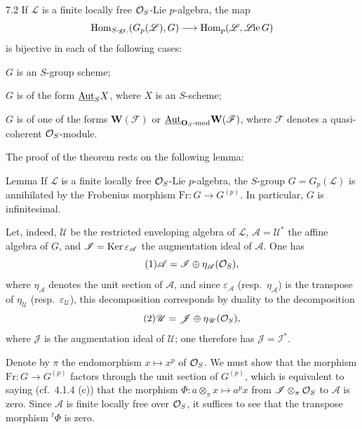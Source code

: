 \begin{theorem}{7.2}\label{VIIA.7.2}
If $\mathscr L$ is a finite locally free $\mathcal{O}_S$-Lie $p$-algebra, the map
\[
\operatorname{Hom}_{S\text{-gr.}}(G_p(\mathscr L),G)\longrightarrow\operatorname{Hom}_p(\mathscr L,\mathscr L\!\mathrm{ie}\,G)
\]
is bijective in each of the following cases:
\begin{enumeratei}
\item $G$ is an $S$-group scheme;
\item $G$ is of the form $\underline{\operatorname{Aut}}_S X$, where $X$ is an $S$-scheme;
\item $G$ is of one of the forms $\mathbf W(\mathscr F)$ or $\underline{\operatorname{Aut}}_{\mathbf O_S\text{-mod}}\mathbf W(\mathscr F)$, where $\mathscr F$ denotes a quasi-coherent $\mathcal{O}_S$-module.
\end{enumeratei}
\end{theorem}
The proof of the theorem rests on the following lemma:
\begin{enonce}{Lemma}{}
If $\mathscr L$ is a finite locally free $\mathcal{O}_S$-Lie $p$-algebra, the $S$-group $G=G_p(\mathscr L)$ is annihilated by the Frobenius morphism $\mathrm{Fr}:G\to G^{(p)}$. In particular, $G$ is infinitesimal.
\end{enonce}

Let, indeed, $\mathscr U$ be the restricted enveloping algebra of $\mathscr L$, $\mathscr A=\mathscr U^*$ the affine algebra of $G$, and $\mathscr I=\operatorname{Ker}\varepsilon_{\mathscr A}$ the augmentation ideal of $\mathscr A$. One has
\begin{equation}\tag{1}\mathscr A=\mathscr I\oplus\eta_{\mathscr A}(\mathcal{O}_S),\end{equation}
where $\eta_{\mathscr A}$ denotes the unit section of $\mathscr A$, and since $\varepsilon_{\mathscr A}$ (resp.\ $\eta_{\mathscr A}$) is the transpose of $\eta_{\mathscr U}$ (resp.\ $\varepsilon_{\mathscr U}$), this decomposition corresponds by duality to the decomposition
\begin{equation}\tag{2}\mathscr U=\mathscr J\oplus\eta_{\mathscr U}(\mathcal{O}_S),\end{equation}
where $\mathscr J$ is the augmentation ideal of $\mathscr U$; one therefore has $\mathscr J=\mathscr I^*$.

Denote by $\pi$ the endomorphism $x\mapsto x^p$ of $\mathcal{O}_S$. We must show that the morphism $\mathrm{Fr}:G\to G^{(p)}$ factors through the unit section of $G^{(p)}$, which is equivalent to saying (cf.\ 4.1.4 (c)) that the morphism $\Phi:a\otimes_\pi x\mapsto a^px$ from $\mathscr I\otimes_\pi\mathcal{O}_S$ to $\mathscr A$ is zero. Since $\mathscr A$ is finite locally free over $\mathcal{O}_S$, it suffices to see that the transpose morphism ${}^t\Phi$ is zero.

